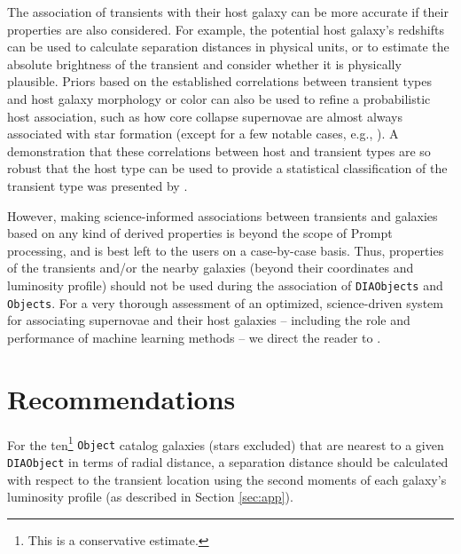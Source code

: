 \documentclass[DM,lsstdraft,authoryear,toc]{lsstdoc}
\begin{document}
The association of transients with their host galaxy can be more accurate if their properties are also considered.
For example, the potential host galaxy's redshifts can be used to calculate separation distances in physical units, or to estimate the absolute brightness of the transient and consider whether it is physically plausible.
Priors based on the established correlations between transient types and host galaxy morphology or color can also be used to refine a probabilistic host association, such as how core collapse supernovae are almost always associated with star formation (except for a few notable cases, e.g., \citealt{2012ApJ...753...68G,2019ApJ...887..127I}).
A demonstration that these correlations between host and transient types are so robust that the host type can be used to provide a statistical classification of the transient type was presented by \citet{2013ApJ...778..167F}.


However, making science-informed associations between transients and galaxies based on any kind of derived properties is beyond the scope of Prompt processing, and is best left to the users on a case-by-case basis. 
Thus, properties of the transients and/or the nearby galaxies (beyond their coordinates and luminosity profile) should not be used during the association of {\tt DIAObjects} and {\tt Objects}.
For a very thorough assessment of an optimized, science-driven system for associating supernovae and their host galaxies -- including the role and performance of machine learning methods -- we direct the reader to \citet{2016AJ....152..154G}.

\section{Recommendations}\label{sec:recs}

For the ten\footnote{This is a conservative estimate.} {\tt Object} catalog galaxies (stars excluded) that are nearest to a given {\tt DIAObject} in terms of radial distance, a separation distance should be calculated with respect to the transient location using the second moments of each galaxy's luminosity profile (as described in Section \ref{sec:app}).
\end{document}

